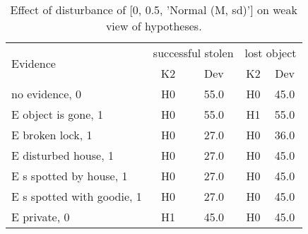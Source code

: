 \begin{table}\begin{tabular}{l|cc|cc}\toprule\multirow{2}{*}{Evidence} & \multicolumn{2}{c}{successful stolen}& \multicolumn{2}{c}{lost object}\\& {K2} & {Dev}& {K2} & {Dev}\\\midrule
no evidence, 0 & \cellcolor{Bittersweet}H0&\cellcolor{Bittersweet}55.0&\cellcolor{Bittersweet}H0&\cellcolor{Bittersweet}45.0\\E object is gone, 1 & \cellcolor{Bittersweet}H0&\cellcolor{Bittersweet}55.0&\cellcolor{Bittersweet}H1&\cellcolor{Bittersweet}55.0\\E broken lock, 1 & \cellcolor{Bittersweet}H0&\cellcolor{Bittersweet}27.0&\cellcolor{Bittersweet}H0&\cellcolor{Bittersweet}36.0\\E disturbed house, 1 & \cellcolor{Bittersweet}H0&\cellcolor{Bittersweet}27.0&\cellcolor{Bittersweet}H0&\cellcolor{Bittersweet}45.0\\E s spotted by house, 1 & \cellcolor{Bittersweet}H0&\cellcolor{Bittersweet}27.0&\cellcolor{Bittersweet}H0&\cellcolor{Bittersweet}45.0\\E s spotted with goodie, 1 & \cellcolor{Bittersweet}H0&\cellcolor{Bittersweet}27.0&\cellcolor{Bittersweet}H0&\cellcolor{Bittersweet}45.0\\E private, 0 & \cellcolor{Bittersweet}H1&\cellcolor{Bittersweet}45.0&\cellcolor{Bittersweet}H0&\cellcolor{Bittersweet}45.0\\\bottomrule\end{tabular}\caption{Effect of disturbance of [0, 0.5, 'Normal (M, sd)'] on weak view of hypotheses.}\end{table}